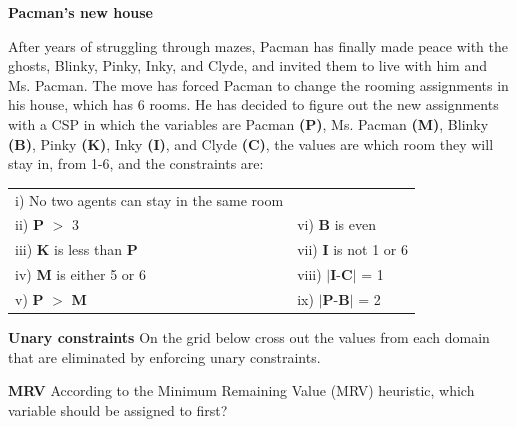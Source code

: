 
\begin{question}[]{\bf Pacman's new house}

After years of struggling through mazes, Pacman has finally made peace with the ghosts, Blinky, Pinky, Inky, and Clyde, and invited them to live with him and Ms. Pacman. The move has forced Pacman to change the rooming assignments in his house, which has 6 rooms. He has decided to figure out the new assignments with a CSP in which the variables are Pacman \textbf{(P)}, Ms. Pacman \textbf{(M)}, Blinky \textbf{(B)}, Pinky \textbf{(K)}, Inky \textbf{(I)}, and Clyde \textbf{(C)}, the values are which room they will stay in, from 1-6, and the constraints are:
\begin{table}[h]
\centering
\begin{tabular}{ll}
i) No two agents can stay in the same room&\\
ii) \textbf{P} $>$ 3 &
vi) \textbf{B} is even\\
iii) \textbf{K} is less than \textbf{P}&
vii) \textbf{I} is not 1 or 6\\
iv) \textbf{M} is either 5 or 6&
viii) $\vert$\textbf{I}-\textbf{C}$\vert$ = 1\\
v) \textbf{P} $>$ \textbf{M}&
ix) $\vert$\textbf{P}-\textbf{B}$\vert$ = 2
\end{tabular}
\end{table}
\begin{subquestion}[1]{\bf Unary constraints}
On the grid below cross out the values from each domain that are eliminated by enforcing unary constraints.
\end{subquestion}
\begin{subquestion}[1]{\bf MRV}
According to the Minimum Remaining Value (MRV) heuristic, which variable should be assigned to first?\\\\
\AnswerOneAii


\end{subquestion}
\end{question}
